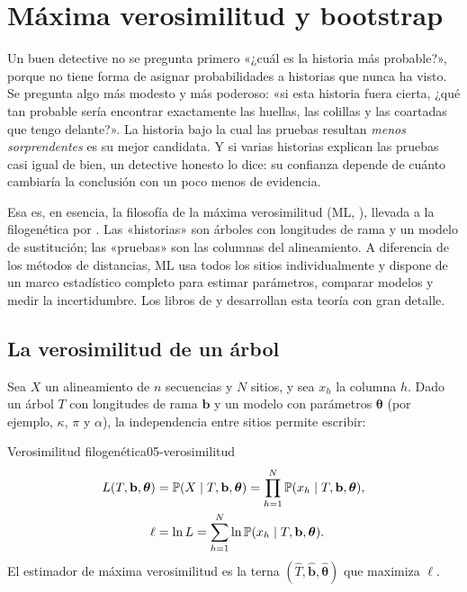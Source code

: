 \section{Máxima verosimilitud y bootstrap}\label{sec:05-ml}

\begin{intuicion}
Un buen detective no se pregunta primero «¿cuál es la historia más probable?», porque no tiene forma de asignar probabilidades a historias que nunca ha visto. Se pregunta algo más modesto y más poderoso: «si esta historia fuera cierta, ¿qué tan probable sería encontrar exactamente las huellas, las colillas y las coartadas que tengo delante?». La historia bajo la cual las pruebas resultan \emph{menos sorprendentes} es su mejor candidata. Y si varias historias explican las pruebas casi igual de bien, un detective honesto lo dice: su confianza depende de cuánto cambiaría la conclusión con un poco menos de evidencia.
\end{intuicion}

Esa es, en esencia, la filosofía de la máxima verosimilitud (ML, ), llevada a la filogenética por \textcite{c05-felsenstein1981}. Las «historias» son árboles con longitudes de rama y un modelo de sustitución; las «pruebas» son las columnas del alineamiento. A diferencia de los métodos de distancias, ML usa todos los sitios individualmente y dispone de un marco estadístico completo para estimar parámetros, comparar modelos y medir la incertidumbre. Los libros de \textcite{c05-felsenstein2004} y \textcite{c05-yang2014} desarrollan esta teoría con gran detalle.

\subsection{La verosimilitud de un árbol}

Sea $X$ un alineamiento de $n$ secuencias y $N$ sitios, y sea $x_h$ la columna $h$. Dado un árbol $T$ con longitudes de rama $\mathbf b$ y un modelo con parámetros $\boldsymbol\theta$ (por ejemplo, $\kappa$, $\pi$ y $\alpha$), la independencia entre sitios permite escribir:

\begin{definicion}{Verosimilitud filogenética}{05-verosimilitud}
\begin{equation}\label{eq:05-lik}
\begin{aligned}
L(T,\mathbf b,\boldsymbol\theta) &= \mathbb{P}(X\mid T,\mathbf b,\boldsymbol\theta) = \prod_{h=1}^{N}\mathbb{P}(x_h\mid T,\mathbf b,\boldsymbol\theta),\\
\ell &= \ln L = \sum_{h=1}^{N}\ln\mathbb{P}(x_h\mid T,\mathbf b,\boldsymbol\theta).
\end{aligned}
\end{equation}
El estimador de máxima verosimilitud es la terna $(\hat T,\hat{\mathbf b},\hat{\boldsymbol\theta})$ que maximiza $\ell$.
\end{definicion}

